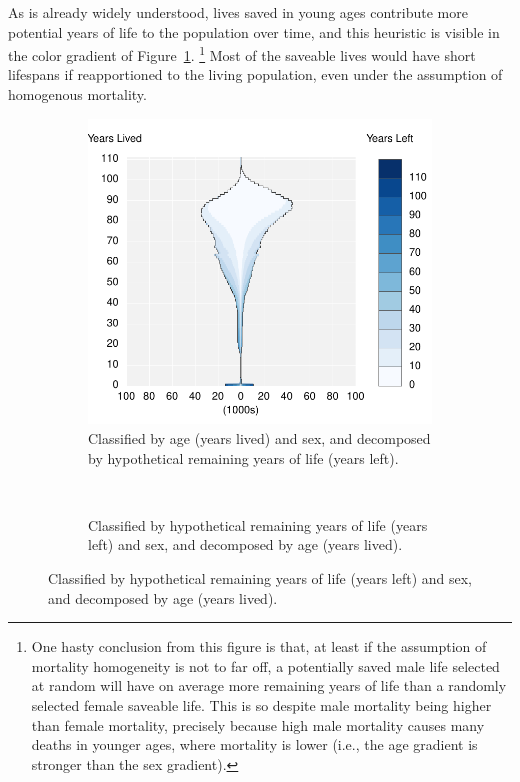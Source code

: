 \documentclass{article}
\begin{document}
As is already widely understood, lives saved in young
ages contribute more potential years of life to the population over time, and this heuristic is visible in the color gradient of Figure~\ref{fig:Day}. \footnote{One hasty conclusion from this figure is that, at least if the assumption of mortality homogeneity is not to far off, a potentially saved male life selected at random will have on average more remaining years of life than a randomly selected female saveable life. This is so despite male mortality being higher than female mortality, precisely because high male mortality causes many deaths
in younger ages, where mortality is lower (i.e., the age gradient is stronger
than the sex gradient).} Most of the saveable lives would have short lifespans
if reapportioned to the living population, even under the assumption of
homogenous mortality.
\begin{figure}
\centering
\caption{US, 2010 potentially saveable lives (Deaths)*}
\label{fig:1}
\begin{subfigure}[b]{.48\linewidth}
\centering
	\caption{Classified by age (years lived) and sex, and decomposed
by hypothetical remaining years of life (years left).}
	\label{fig:Day}
	\includegraphics[scale=.55]{Figures/Deathsxy10.pdf}	
\end{subfigure}
~
\begin{subfigure}[b]{.48\linewidth}
\centering
    \caption{Classified by hypothetical remaining years of life
(years left) and sex, and decomposed by age (years lived).}

\end{subfigure}
\end{figure}
\end{document}
